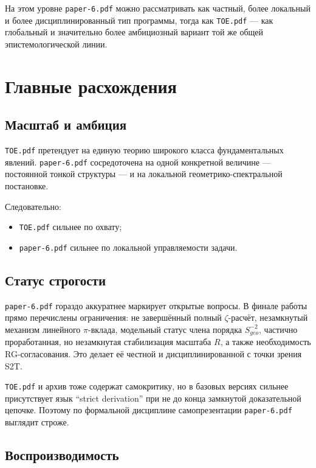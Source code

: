 \documentclass[12pt,a4paper]{article}
\begin{document}
На этом уровне \texttt{paper-6.pdf} можно рассматривать как частный, более локальный и более дисциплинированный тип программы, тогда как \texttt{TOE.pdf} --- как глобальный и значительно более амбициозный вариант той же общей эпистемологической линии.

\section{Главные расхождения}

\subsection{Масштаб и амбиция}

\texttt{TOE.pdf} претендует на единую теорию широкого класса фундаментальных явлений. \texttt{paper-6.pdf} сосредоточена на одной конкретной величине --- постоянной тонкой структуры --- и на локальной геометрико-спектральной постановке.

Следовательно:
\begin{itemize}
    \item \texttt{TOE.pdf} сильнее по охвату;
    \item \texttt{paper-6.pdf} сильнее по локальной управляемости задачи.
\end{itemize}

\subsection{Статус строгости}

\texttt{paper-6.pdf} гораздо аккуратнее маркирует открытые вопросы. В финале работы прямо перечислены ограничения: не завершённый полный \(\zeta\)-расчёт, незамкнутый механизм линейного \(\pi\)-вклада, модельный статус члена порядка \(S^{-2}_{geo}\), частично проработанная, но незамкнутая стабилизация масштаба \(R\), а также необходимость RG-согласования. Это делает её честной и дисциплинированной с точки зрения S2T.

\texttt{TOE.pdf} и архив тоже содержат самокритику, но в базовых версиях сильнее присутствует язык ``strict derivation'' при не до конца замкнутой доказательной цепочке. Поэтому по формальной дисциплине самопрезентации \texttt{paper-6.pdf} выглядит строже.

\subsection{Воспроизводимость}
\end{document}
